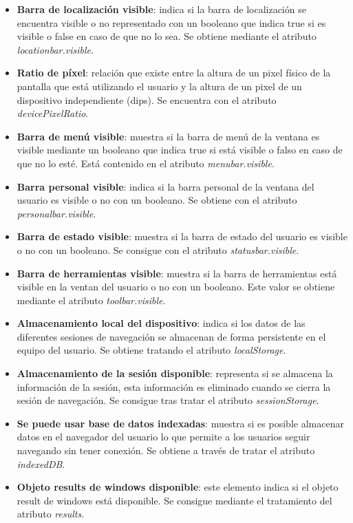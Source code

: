 \begin{itemize} 
    \item \textbf{Barra de localización visible}: indica si la barra de localización se encuentra visible o no representado con un booleano que indica true si es visible o false en caso de que no lo sea. Se obtiene mediante el atributo \textit{locationbar.visible}.
    \item \textbf{Ratio de píxel}: relación que existe entre la altura de un pixel físico de la pantalla que está utilizando el usuario y la altura de un pixel de un dispositivo independiente (dips). Se encuentra con el atributo \textit{devicePixelRatio}.
    \item \textbf{Barra de menú visible}: muestra si la barra de menú de la ventana es visible mediante un booleano que indica true si está visible o falso en caso de que no lo esté. Está contenido en el atributo \textit{menubar.visible}.
    \item \textbf{Barra personal visible}: indica si la barra personal de la ventana del usuario es visible o no con un booleano. Se obtiene con el atributo \textit{personalbar.visible}.
    \item \textbf{Barra de estado visible}: muestra si la barra de estado del usuario es visible o no con un booleano. Se consigue con el atributo \textit{statusbar.visible}.
    \item \textbf{Barra de herramientas visible}: muestra si la barra de herramientas está visible en la ventan del usuario o no con un booleano. Este valor se obtiene mediante el atributo \textit{toolbar.visible}.
    \item \textbf{Almacenamiento local del dispositivo}: indica si los datos de las diferentes sesiones de navegación se almacenan de forma persistente en el equipo del usuario. Se obtiene tratando el atributo \textit{localStorage}.
    \item \textbf{Almacenamiento de la sesión disponible}: representa si se almacena la información de la sesión, esta información es eliminado cuando se cierra la sesión de navegación. Se consigue tras tratar el atributo \textit{sessionStorage}.
    \item \textbf{Se puede usar base de datos indexadas}: muestra si es posible almacenar datos en el navegador del usuario lo que permite a los usuarios seguir navegando sin tener conexión. Se obtiene a través de tratar el atributo \textit{indexedDB}.
    \item \textbf{Objeto results de windows disponible}: este elemento indica si el objeto result de windows está disponible. Se consigue mediante el tratamiento del atributo \textit{results}.
\end{itemize}
